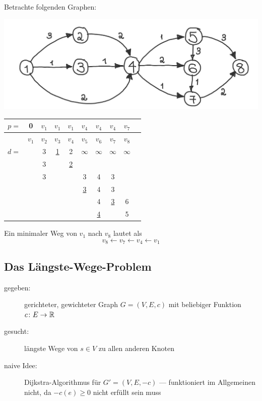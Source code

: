 \begin{beispiel}
	Betrachte folgenden Graphen:

	\begin{minipage}{\dimexpr0.5\linewidth-\fboxrule-\fboxsep}
		\centering
		\includegraphics[width=\linewidth]{./optinum_abb/optinum_5_3_bsp5-2.jpg}
	\end{minipage}
	\begin{minipage}{\dimexpr0.5\linewidth-\fboxrule-\fboxsep}
		\begin{tabular}{rccccccccc}
			$p =$ & 0 & $v_1$ & $v_1$ & $v_1$ & $v_4$ & $v_4$ & $v_4$ & \cancel{$v_5$} $v_7$ \\ \hline
			    & $v_1$ & $v_2$ & $v_3$ & $v_4$ & $v_5$ & $v_6$ & $v_7$ & $v_8$ \\ \hline
			$d =$ & \fbox{0} & 3 & \uline{1} & 2 & $\infty$ & $\infty$ & $\infty$ & $\infty$ \\
				&          & 3 &           & \uline{2} & &  & &  \\
				&          & 3 &           &        & 3         & 4 & 3 & \\
				&          &   &           &        & \uline{3} & 4 & 3 & \\
				&          &   &           &        &           & 4 & \uline{3} & 6 \\
				&          &   &           &        &           & \uline{4} &           & 5 \\
		\end{tabular}
	\end{minipage}

	Ein minimaler Weg von $v_1$ nach $v_8$ lautet als
	\begin{equation*}
		v_8 \leftarrow v_7 \leftarrow v_4 \leftarrow v_1
	\end{equation*}
\end{beispiel}


\subsection{Das Längste-Wege-Problem}
\begin{description}
	\item[gegeben:] gerichteter, gewichteter Graph $G = (V,E,c)$ mit beliebiger Funktion $\abb{c}{E}{\R}$
	\item[gesucht:] längste Wege von $s \in V$ zu allen anderen Knoten
	\item[naive Idee:] Dijkstra-Algorithmus für $G' = (V,E,-c)$ --- funktioniert im Allgemeinen nicht, da $-c(e) \ge 0$ nicht erfüllt sein muss
\end{description}

